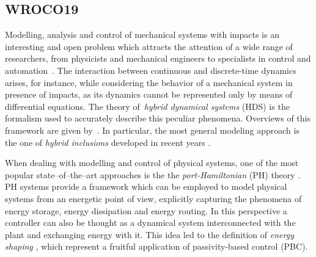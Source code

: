 {\color{red}
\subsection{WROCO19}
Modelling, analysis and control of mechanical systems with impacts is an interesting and open problem which attracts the attention of a wide range of researchers, from physicists and mechanical engineers to specialists in control and automation~\cite{brogliato1999nonsmooth,stronge2018impact}.
The interaction between continuous and discrete-time dynamics arises, for instance, while considering the behavior of a mechanical system in presence of impacts, as its dynamics cannot be represented only by means of differential equations. The theory of~\textit{hybrid dynamical systems} (HDS) is the formalism used to accurately describe this peculiar phenomena. Overviews of this framework are given by~\cite{van2000introduction,haddad2006impulsive}. In particular, the most general modeling approach is the one of \textit{hybrid inclusions} developed in recent years \cite{goebel2009hybrid}.

When dealing with modelling and control of physical systems, one of the most popular state--of--the--art approaches is the the \textit{port-Hamiltonian} (PH) theory \cite{secchi2007control,van2014port}. PH systems provide a framework which can be employed to model physical systems from an energetic point of view, explicitly capturing the phenomena of energy storage, energy dissipation and energy routing. 
In this perspective a controller can also be thought as a dynamical system interconnected with the plant and exchanging energy with it. 
This idea led to the definition of \textit{energy shaping} \cite{ortega2001putting}, which represent a fruitful application of passivity-based control (PBC).

}
